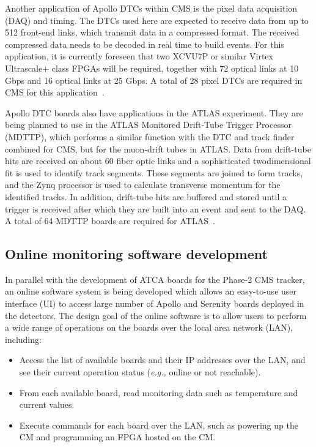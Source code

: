 Another application of Apollo DTCs within CMS is the pixel data acquisition (DAQ) and timing.
The DTCs used here are expected to receive data from up to 512 front-end links, which transmit
data in a compressed format. The received compressed data needs to be decoded in real time
to build events. For this application, it is currently foreseen that  two XCVU7P or similar Virtex 
Ultrascale+ class FPGAs will be required, together with 72 optical links at 10 Gbps and 16 optical 
links at 25 Gbps. A total of 28 pixel DTCs are required in CMS for this application~\cite{CMS:ApolloPaper}.

Apollo DTC boards also have applications in the ATLAS experiment. They are being planned to use
in the ATLAS  Monitored Drift-Tube Trigger Processor (MDTTP), which performs a similar function
with the DTC and track finder combined for CMS, but for the muon-drift tubes in ATLAS. Data from drift-tube
hits are received on about 60 fiber optic links and a sophisticated twodimensional fit is used to identify track segments. 
These segments are joined to form tracks, and
the Zynq processor is used to calculate transverse momentum for the identified tracks. In addition,
drift-tube hits are buffered and stored until a trigger is received after which they are built into an
event and sent to the DAQ. A total of 64 MDTTP boards are required for ATLAS~\cite{CMS:ApolloPaper}.

\subsection{Online monitoring software development}

In parallel with the development of ATCA boards for the Phase-2 CMS tracker, an online software system is being
developed which allows an easy-to-use user interface (UI) to access large number of Apollo and Serenity boards
deployed in the detectors. The design goal of the online software is to allow users to perform a wide range of 
operations on the boards over the local area network (LAN), including:

\begin{itemize}
    \item Access the list of available boards and their IP addresses over the LAN, and see their current operation status
    (\textit{e.g.,} online or not reachable).
    \item From each available board, read monitoring data such as temperature and current values.
    \item Execute commands for each board over the LAN, such as powering up the CM and programming an FPGA hosted on the CM.
\end{itemize}


